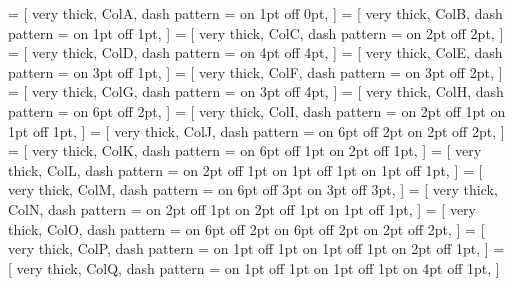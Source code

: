 



 = [
very thick, ColA, dash pattern = {on 1pt off 0pt}, %
]
 = [
very thick, ColB, dash pattern = {on 1pt off 1pt}, %
]
 = [
very thick, ColC, dash pattern = {on 2pt off 2pt}, %
]
 = [
very thick, ColD, dash pattern = {on 4pt off 4pt}, %
]
 = [
very thick, ColE, dash pattern = {on 3pt off 1pt}, %
]
 = [
very thick, ColF, dash pattern = {on 3pt off 2pt}, %
]
 = [
very thick, ColG, dash pattern = {on 3pt off 4pt}, %
]
 = [
very thick, ColH, dash pattern = {on 6pt off 2pt}, %
]
 = [
very thick, ColI, dash pattern = {on 2pt off 1pt on 1pt off 1pt}, %
]
 = [
very thick, ColJ, dash pattern = {on 6pt off 2pt on 2pt off 2pt}, %
]
 = [
very thick, ColK, dash pattern = {on 6pt off 1pt on 2pt off 1pt}, %
]
 = [
very thick, ColL, dash pattern = {on 2pt off 1pt on 1pt off 1pt on 1pt off 1pt}, %
]
 = [
very thick, ColM, dash pattern = {on 6pt off 3pt on 3pt off 3pt}, %
]
 = [
very thick, ColN, dash pattern = {on 2pt off 1pt on 2pt off 1pt on 1pt off 1pt}, %
]
 = [
very thick, ColO, dash pattern = {on 6pt off 2pt on 6pt off 2pt on 2pt off 2pt}, %
]
 = [
very thick, ColP, dash pattern = {on 1pt off 1pt on 1pt off 1pt on 2pt off 1pt}, %
]
 = [
very thick, ColQ, dash pattern = {on 1pt off 1pt on 1pt off 1pt on 4pt off 1pt}, %
]

